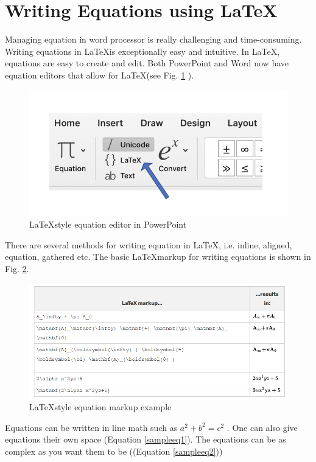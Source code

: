 \documentclass[a4paper, 12pt, one column]{article}
\begin{document}
\section{Writing Equations using \LaTeX}

    Managing equation in word processor is really challenging and time-consuming. Writing equations in \LaTeX \space is exceptionally easy and intuitive.  In \LaTeX , equations are easy to create and edit. Both PowerPoint and Word now have equation editors that allow for \LaTeX \space (see Fig. \ref{eqWord} ). 

    \begin{figure}[!httb]
        \centering
        \includegraphics[width=0.6\linewidth]{eqWord.png}
        \caption{ \LaTeX \space style equation editor in PowerPoint}
        \label{eqWord}
        \end{figure}

    There are several methods for writing equation in \LaTeX, i.e. inline, aligned, equation, gathered etc. The basic \LaTeX markup for writing equations is shown in Fig. \ref{eqDemo}. 

    \begin{figure}[!httb]
        \centering
        \includegraphics[width=0.8\linewidth]{eqDemo.png}
        \caption{ \LaTeX \space style equation markup example}
        \label{eqDemo}
        \end{figure}

    Equations can be written in line math such as $a^2+b^2=c^2$ . One can also give equations their own space (Equation \ref{sampleeq1}). The equations can be as complex as you want them to be ((Equation \ref{sampleeq2}))
\end{document}
